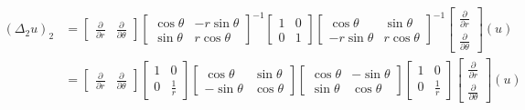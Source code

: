 \documentclass[../main.tex]{subfiles}
\begin{document}
\begin{align*}
    \left( \Delta_2 u \right)_2
    &=
    \begin{bmatrix}
        \frac{\partial}{\partial r} & \frac{\partial}{\partial \theta}
    \end{bmatrix}
    \begin{bmatrix}
        \cos \theta & -r \sin \theta \\
        \sin \theta & r \cos \theta
    \end{bmatrix}^{-1}
    \begin{bmatrix}
        1 & 0 \\
        0 & 1
    \end{bmatrix}
    \begin{bmatrix}
        \cos \theta & \sin \theta \\
        -r \sin \theta & r \cos \theta
    \end{bmatrix}^{-1}
    \begin{bmatrix}
        \frac{\partial}{\partial r} \\
        \frac{\partial}{\partial \theta}
    \end{bmatrix}
    \left( u \right) \\
    &=
    \begin{bmatrix}
        \frac{\partial}{\partial r} & \frac{\partial}{\partial \theta}
    \end{bmatrix}
    \begin{bmatrix}
        1 & 0 \\
        0 & \frac{1}{r}
    \end{bmatrix}
    \begin{bmatrix}
        \cos \theta & \sin \theta \\
        - \sin \theta & \cos \theta
    \end{bmatrix}
    \begin{bmatrix}
        \cos \theta & - \sin \theta \\
        \sin \theta & \cos \theta
    \end{bmatrix}
    \begin{bmatrix}
        1 & 0 \\
        0 & \frac{1}{r}
    \end{bmatrix}
    \begin{bmatrix}
        \frac{\partial}{\partial r} \\
        \frac{\partial}{\partial \theta}
    \end{bmatrix}
    \left( u \right) \\

\end{align*}
\end{document}
